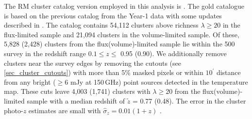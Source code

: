 The RM cluster catalog version employed in this analysis is \whichcatversion. 
The \whichyear{} gold catalogue is based on the previous catalog from the Year-1 data \citep{drlica-wagner17} with some updates described in \citet{morganson18}.
The catalog contains 54,112 clusters above richness $\lambda \ge 20$ in the flux-limited sample and 21,094 clusters in the volume-limited sample. %
Of these, 5,828 (2,428) clusters from the flux(volume)-limited sample lie within the \sptpol{} 500 \sqdeg{} survey  in the redshift range $0.1 \le z \le$ 0.95 (0.90). 
We additionally remove clusters near the survey edges by removing the cutouts (see \ref{sec_cluster_cutouts}) with more than 5\% masked pixels or within $10^{\prime}$ distance from any bright ($\ge 6$ mJy at 150\,GHz) point sources detected in the \sptpol{} temperature map.
These cuts leave 4,003 (1,741) clusters with $\lambda \ge 20$ from the flux(volume)-limited sample with a median redshift of $\tilde{z}$ = 0.77 (0.48). 
The error in the cluster photo-$z$ estimates are small with $\hat{\sigma}_{z} = 0.01 (1+z)$ \citep{rozo15}.

